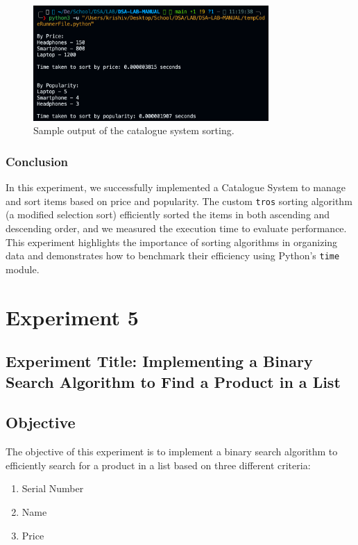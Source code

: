 \documentclass[a4paper,12pt]{article}
\begin{document}
\begin{figure}[h]
    \centering
    \includegraphics[width=0.8\textwidth]{output_screenshot_exp4.png}
    \caption{Sample output of the catalogue system sorting.}
    \label{fig:output_exp4}
\end{figure}

\subsubsection*{Conclusion}
In this experiment, we successfully implemented a Catalogue System to manage and sort items based on price and popularity. The custom \texttt{tros} sorting algorithm (a modified selection sort) efficiently sorted the items in both ascending and descending order, and we measured the execution time to evaluate performance. This experiment highlights the importance of sorting algorithms in organizing data and demonstrates how to benchmark their efficiency using Python's \texttt{time} module.

\clearpage

\section*{ Experiment 5}
\label{sec:exp5}
\subsection*{Experiment Title: Implementing a Binary Search Algorithm to Find a Product in a List  }

\subsection*{Objective}
The objective of this experiment is to implement a binary search algorithm to efficiently search for a product in a list based on three different criteria:
\begin{enumerate}
    \item{Serial Number}
    \item{Name}
    \item{Price}
\end{enumerate}
\end{document}
